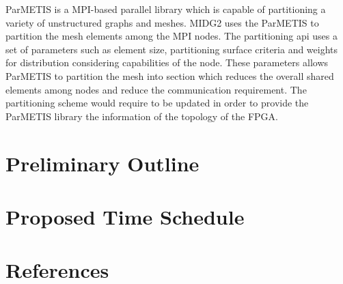 \documentclass[english,notitlepage]{hgbreport}
\begin{document}
ParMETIS is a MPI-based parallel library which is capable of partitioning a variety of unstructured graphs and meshes. MIDG2
uses the ParMETIS to partition the mesh elements among the MPI nodes. The partitioning api uses a set of parameters such as element
size, partitioning surface criteria and weights for distribution considering capabilities of the node. These parameters allows
ParMETIS to partition the mesh into section which reduces the overall shared elements among nodes and reduce the communication requirement.
The partitioning scheme would require to be updated in order to provide the ParMETIS library the information of the topology of the FPGA.

\section{Preliminary Outline}

\section{Proposed Time Schedule}



\section*{References}

\printbibliography[heading=noheader]

\end{document}
